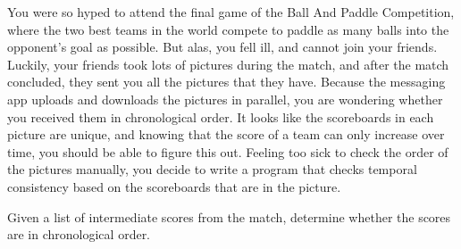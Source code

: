 





You were so hyped to attend the final game of the Ball And Paddle Competition,
where the two best teams in the world compete to paddle as many balls into the opponent's goal as possible.
But alas, you fell ill, and cannot join your friends.
Luckily, your friends took lots of pictures during the match,
and after the match concluded, they sent you all the pictures that they have.
Because the messaging app uploads and downloads the pictures in parallel,
you are wondering whether you received them in chronological order.
It looks like the scoreboards in each picture are unique,
and knowing that the score of a team can only increase over time,
you should be able to figure this out.
Feeling too sick to check the order of the pictures manually,
you decide to write a program that checks temporal consistency based on the scoreboards that are in the picture.

Given a list of intermediate scores from the match,
determine whether the scores are in chronological order.

